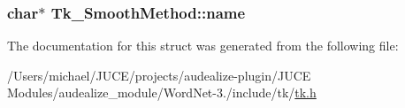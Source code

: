 \subsubsection[{\texorpdfstring{name}{name}}]{\setlength{\rightskip}{0pt plus 5cm}char$\ast$ Tk\+\_\+\+Smooth\+Method\+::name}\hypertarget{struct_tk___smooth_method_a538eaa7a8b35a3ad3683c951c83b9753}{}\label{struct_tk___smooth_method_a538eaa7a8b35a3ad3683c951c83b9753}


The documentation for this struct was generated from the following file\+:\begin{DoxyCompactItemize}
\item 
/\+Users/michael/\+J\+U\+C\+E/projects/audealize-\/plugin/\+J\+U\+C\+E Modules/audealize\+\_\+module/\+Word\+Net-\/3./include/tk/\hyperlink{tk_8h}{tk.\+h}\end{DoxyCompactItemize}
